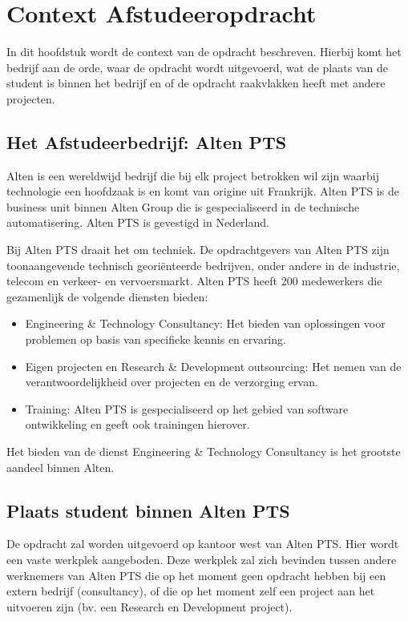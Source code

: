\documentclass{../local}
\begin{document}
\section{Context Afstudeeropdracht}
In dit hoofdstuk wordt de context van de opdracht beschreven. Hierbij komt het bedrijf aan de orde, waar de opdracht wordt uitgevoerd, wat de plaats van de student is binnen het bedrijf en of de opdracht raakvlakken heeft met andere projecten. 

\subsection{Het Afstudeerbedrijf: Alten PTS}
Alten is een wereldwijd bedrijf die bij elk project betrokken wil zijn waarbij technologie een hoofdzaak is en komt van origine uit Frankrijk. Alten PTS is de business unit binnen Alten Group die is gespecialiseerd in de technische automatisering. Alten PTS is gevestigd in Nederland.

Bij Alten PTS draait het om techniek. De opdrachtgevers van Alten PTS zijn toonaangevende technisch georiënteerde bedrijven, onder andere in de industrie, telecom en verkeer- en vervoersmarkt. Alten PTS heeft 200 medewerkers die gezamenlijk de volgende diensten bieden:

\begin{itemize}

\item Engineering \& Technology Consultancy: Het bieden van oplossingen voor problemen op basis van specifieke kennis en ervaring.
\item Eigen projecten en Research \& Development outsourcing: Het nemen van de verantwoordelijkheid over projecten en de verzorging ervan.
\item Training: Alten PTS is gespecialiseerd op het gebied van software ontwikkeling en geeft ook trainingen hierover.

\end{itemize}

Het bieden van de dienst Engineering \& Technology Consultancy is het grootste aandeel binnen Alten.\cite{Alten}

\subsection{Plaats student binnen Alten PTS}
De opdracht zal worden uitgevoerd op kantoor west van Alten PTS. Hier wordt een vaste werkplek aangeboden. Deze werkplek zal zich bevinden tussen andere werknemers van Alten PTS die op het moment geen opdracht hebben bij een extern bedrijf (consultancy), of die op het moment zelf een project aan het uitvoeren zijn (bv. een Research en Development project).
\end{document}
